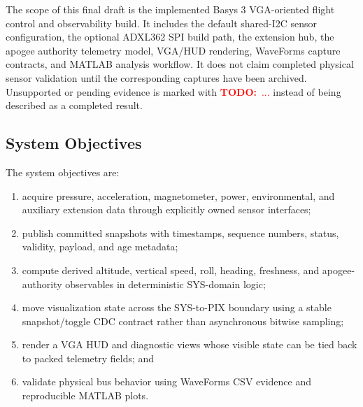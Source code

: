 \documentclass[11pt]{article}
\newcommand{\sig}[1]{\texttt{\detokenize{#1}}}
\newcommand{\TODO}[1]{\textcolor{red}{\textbf{TODO:}~#1}}
\begin{document}
The scope of this final draft is the implemented Basys 3 VGA-oriented flight
control and observability build.  It includes the default shared-I2C sensor
configuration, the optional ADXL362 SPI build path, the extension hub, the
apogee authority telemetry model, VGA/HUD rendering, WaveForms capture
contracts, and MATLAB analysis workflow.  It does not claim completed physical
sensor validation until the corresponding \sig{WF-*} captures have been
archived.  Unsupported or pending evidence is marked with \TODO{...} instead of
being described as a completed result.

\subsection{System Objectives}
\label{subsec:objectives}

The system objectives are:

\begin{enumerate}[leftmargin=*]
  \item acquire pressure, acceleration, magnetometer, power, environmental,
        and auxiliary extension data through explicitly owned sensor interfaces;
  \item publish committed snapshots with timestamps, sequence numbers, status,
        validity, payload, and age metadata;
  \item compute derived altitude, vertical speed, roll, heading, freshness, and
        apogee-authority observables in deterministic SYS-domain logic;
  \item move visualization state across the SYS-to-PIX boundary using a stable
        snapshot/toggle CDC contract rather than asynchronous bitwise sampling;
  \item render a VGA HUD and diagnostic views whose visible state can be tied
        back to packed telemetry fields; and
  \item validate physical bus behavior using WaveForms CSV evidence and
        reproducible MATLAB plots.
\end{enumerate}
\end{document}
